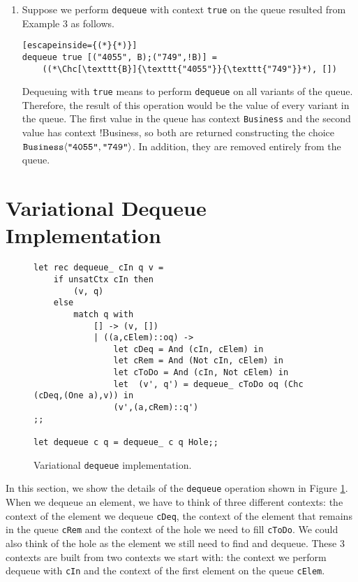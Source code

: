 \begin{enumerate}[label=Example \arabic*:]
\begin{lstlisting}
    ("Flight cost:", [("4055", B);("749",!B)])
\end{lstlisting}
%
The context of the first value on the queue is \texttt{!Business} which is the same context we are dequeuing with, so we return the value and remove it completely from the queue. This value has been dequeued in both variants after this (In Example 1 and in this Example). 
%
\item Suppose we perform \texttt{dequeue} with context \texttt{true} on the queue resulted from Example 3 as follows. 
%
\begin{lstlisting}[escapeinside={(*}{*)}]
dequeue true [("4055", B);("749",!B)] = 
    ((*\Chc[\texttt{B}]{\texttt{"4055"}}{\texttt{"749"}}*), [])
\end{lstlisting}
%
Dequeuing with \texttt{true} means to perform \texttt{dequeue} on all variants of the queue. Therefore, the result of this operation would be the value of every variant in the queue. The first value in the queue has context \texttt{Business} and the second value has context !Business, so both are returned constructing the choice $\Chc[\texttt{Business}]{\texttt{"4055"}}{\texttt{"749"}}$. In addition, they are removed entirely from the queue. 
%
\end{enumerate}

\section{Variational Dequeue Implementation}
\label{sec:queue_dequeue}

\begin{figure}
 \begin{lstlisting}
let rec dequeue_ cIn q v = 
    if unsatCtx cIn then 
        (v, q)
    else
        match q with 
            [] -> (v, [])
            | ((a,cElem)::oq) ->
                let cDeq = And (cIn, cElem) in 
                let cRem = And (Not cIn, cElem) in  
                let cToDo = And (cIn, Not cElem) in  
                let  (v', q') = dequeue_ cToDo oq (Chc (cDeq,(One a),v)) in
                (v',(a,cRem)::q')
;;

let dequeue c q = dequeue_ c q Hole;;
\end{lstlisting}
  \caption{Variational \texttt{dequeue} implementation.}
  \label{fig:dequeue}
\end{figure}

In this section, we show the details of the \texttt{dequeue} operation shown in Figure \ref{fig:dequeue}. When we dequeue an element, we have to think of three different contexts: the context of the element we dequeue \texttt{cDeq}, the context of the element that remains in the queue \texttt{cRem} and the context of the hole we need to fill \texttt{cToDo}. We could also think of the hole as the element we still need to find and dequeue. These 3 contexts are built from two contexts we start with: the context we perform dequeue with \texttt{cIn} and the context of the first element on the queue \texttt{cElem}.

